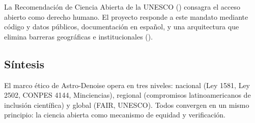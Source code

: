 La Recomendación de Ciencia Abierta de la UNESCO (\cite{unesco2021}) consagra el acceso abierto como derecho humano. El proyecto responde a este mandato mediante código y datos públicos, documentación en español, y una arquitectura que elimina barreras geográficas e institucionales (\cite{harrison2017}).

\subsection{Síntesis}

El marco ético de Astro-Denoise opera en tres niveles: nacional (Ley 1581, Ley 2502, CONPES 4144, Minciencias), regional (compromisos latinoamericanos de inclusión científica) y global (FAIR, UNESCO). Todos convergen en un mismo principio: la ciencia abierta como mecanismo de equidad y verificación.
